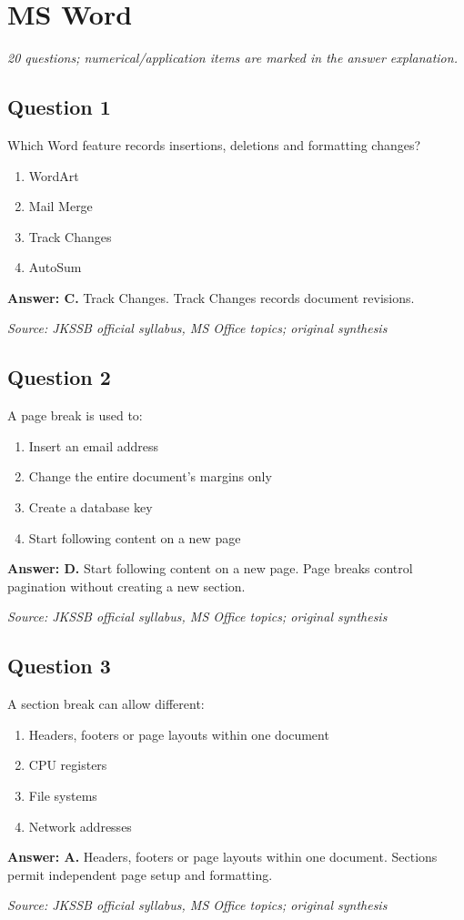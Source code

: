\documentclass[11pt,a4paper]{book}
\newcommand{\source}[1]{\par\smallskip\textit{Source: #1}}
\newcommand{\answer}[2]{\par\textbf{Answer: #1.} #2}
\begin{document}
\chapter{MS Word}
\textit{20 questions; numerical/application items are marked in the answer explanation.}
\section*{Question 1}
Which Word feature records insertions, deletions and formatting changes?
\begin{enumerate}[label=\Alph*.]
\item WordArt
\item Mail Merge
\item Track Changes
\item AutoSum
\end{enumerate}
\answer{C}{Track Changes. Track Changes records document revisions.}
\source{JKSSB official syllabus, MS Office topics; original synthesis}
\section*{Question 2}
A page break is used to:
\begin{enumerate}[label=\Alph*.]
\item Insert an email address
\item Change the entire document’s margins only
\item Create a database key
\item Start following content on a new page
\end{enumerate}
\answer{D}{Start following content on a new page. Page breaks control pagination without creating a new section.}
\source{JKSSB official syllabus, MS Office topics; original synthesis}
\section*{Question 3}
A section break can allow different:
\begin{enumerate}[label=\Alph*.]
\item Headers, footers or page layouts within one document
\item CPU registers
\item File systems
\item Network addresses
\end{enumerate}
\answer{A}{Headers, footers or page layouts within one document. Sections permit independent page setup and formatting.}
\source{JKSSB official syllabus, MS Office topics; original synthesis}
\end{document}
